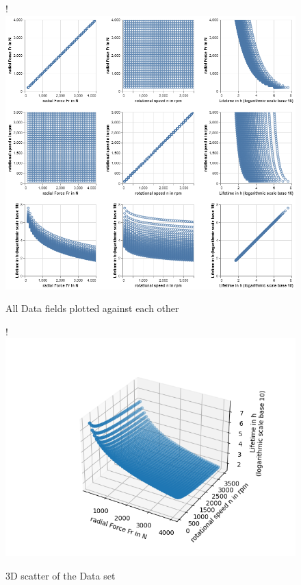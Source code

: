\documentclass[a4paper, 12pt, oneside]{scrbook}
\begin{document}
			\begin{figure}[H]
				\centering
				\begin{minipage}[b]{1\textwidth}
					\resizebox{\linewidth} {!} {
						\includegraphics{res/firstEDA/crosschart.png}
					}	
					\caption{All Data fields plotted against each other}
					\label{fig:EDA_crossplot}
				\end{minipage}
				\hfill
				\begin{minipage}[b]{1\textwidth}
					\resizebox{\linewidth} {!} {
						\includegraphics{res/firstEDA/3dscatter.png}
					}
					\caption{3D scatter of the Data set}
					\label{fig:EDA_3Dscatter}
				\end{minipage}
			\end{figure}
		
\end{document}
